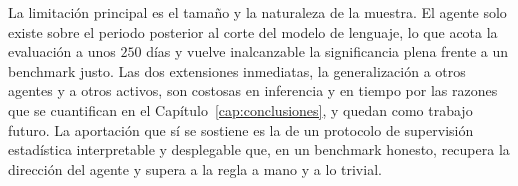 La limitación principal es el tamaño y la naturaleza de la muestra. El agente solo existe sobre el periodo posterior al corte del modelo de lenguaje, lo que acota la evaluación a unos $250$ días y vuelve inalcanzable la significancia plena frente a un benchmark justo. Las dos extensiones inmediatas, la generalización a otros agentes y a otros activos, son costosas en inferencia y en tiempo por las razones que se cuantifican en el Capítulo~\ref{cap:conclusiones}, y quedan como trabajo futuro. La aportación que sí se sostiene es la de un protocolo de supervisión estadística interpretable y desplegable que, en un benchmark honesto, recupera la dirección del agente y supera a la regla a mano y a lo trivial.
